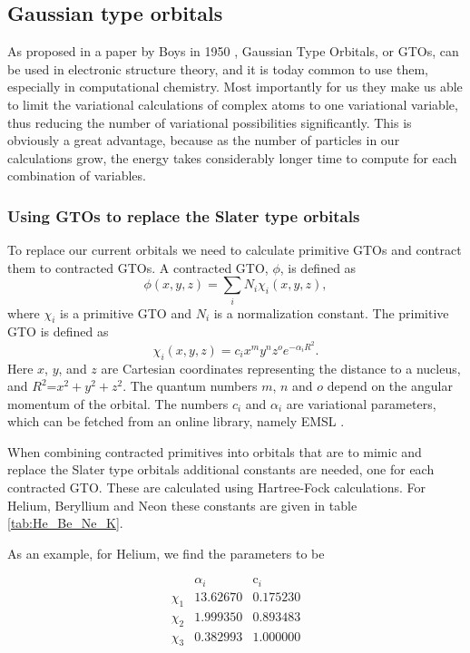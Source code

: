 
\subsection{Gaussian type orbitals}

As proposed in a paper by Boys in 1950 \parencite{Boys_1950},
Gaussian Type Orbitals, or GTOs, can be used in electronic structure
theory, and it is today common to use them, especially in computational
chemistry. Most importantly for us they make us able to limit the
variational calculations of complex atoms to one variational variable,
thus reducing the number of variational possibilities significantly.
This is obviously a great advantage, because as the number of particles
in our calculations grow, the energy takes considerably longer time
to compute for each combination of variables. 


\subsubsection{Using GTOs to replace the Slater type orbitals}

To replace our current orbitals we need to calculate primitive GTOs
and contract them to contracted GTOs. A contracted GTO, $\phi$,
is defined as
\[
\phi\left(x,y,z\right)=\sum_{i}N_{i}\chi_{i}\left(x,y,z\right),
\]
where $\chi_{i}$ is a primitive GTO and $N_{i}$ is a normalization
constant. The primitive GTO is defined as
\[
\chi_{i}\left(x,y,z\right)=c_{i}x^{m}y^{n}z^{o}e^{-\alpha_{i}R^{2}}.
\]
Here $x$, $y$, and $z$ are Cartesian coordinates representing the
distance to a nucleus, and $R^{2}$=$x^{2}+y^{2}+z^{2}$. The quantum
numbers $m$, $n$ and $o$ depend on the angular momentum of the
orbital. The numbers $c_{i}$ and $\alpha_{i}$ are variational parameters,
which can be fetched from an online library, namely EMSL \parencite{Binkley_1980}\parencite{EMSL}.

When combining contracted primitives into orbitals that are to mimic
and replace the Slater type orbitals additional constants are needed,
one for each contracted GTO. These are calculated using Hartree-Fock
calculations. For Helium, Beryllium and Neon these constants are given
in table \ref{tab:He_Be_Ne_K}. 


As an example, for Helium, we find the parameters to be

\[
\begin{array}{ccc}
 & \alpha_{i} & \mbox{c}_{i}\\
\chi_{1} & 13.62670 & 0.175230\\
\chi_{2} & 1.999350 & 0.893483\\
\chi_{3} & 0.382993 & 1.000000
\end{array}
\]

